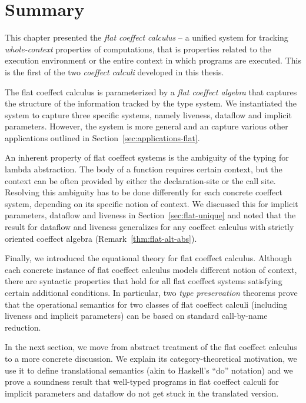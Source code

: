 %
%
\section{Summary}

This chapter presented the \emph{flat coeffect calculus} -- a unified system for tracking
\emph{whole-context} properties of computations, that is properties related to the
execution environment or the entire context in which programs are executed.
This is the first of the two \emph{coeffect calculi} developed in this thesis.

The flat coeffect calculus is parameterized by a \emph{flat coeffect algebra} that captures
the structure of the information tracked by the type system. We instantiated the system to
capture three specific systems, namely liveness, dataflow and implicit parameters. However,
the system is more general and an capture various other applications outlined in
Section~\ref{sec:applications-flat}.

An inherent property of flat coeffect systems is the ambiguity of the typing for lambda
abstraction. The body of a function requires certain context, but the context can be often
provided by either the declaration-site or the call site. Resolving this ambiguity has to be
done differently for each concrete coeffect system, depending on its specific notion of context.
We discussed this for implicit parameters, dataflow and liveness in Section~\ref{sec:flat-unique}
and noted that the result for dataflow and liveness generalizes for any coeffect calculus
with strictly oriented coeffect algebra (Remark~\ref{thm:flat-alt-abs}).

Finally, we introduced the equational theory for flat coeffect calculus. Although each
concrete instance of flat coeffect calculus models different notion of context, there are
syntactic properties that hold for all flat coeffect systems satisfying certain additional
conditions. In particular, two \emph{type preservation} theorems prove that the operational
semantics for two classes of flat coeffect calculi (including liveness and implicit parameters)
can be based on standard call-by-name reduction.

In the next section, we move from abstract treatment of the flat coeffect calculus to a more
concrete discussion. We explain its category-theoretical motivation, we use it to define
translational semantics (akin to Haskell's ``do'' notation) and we prove a soundness result that
well-typed programs in flat coeffect calculi for implicit parameters and dataflow do not get
stuck in the translated version.

